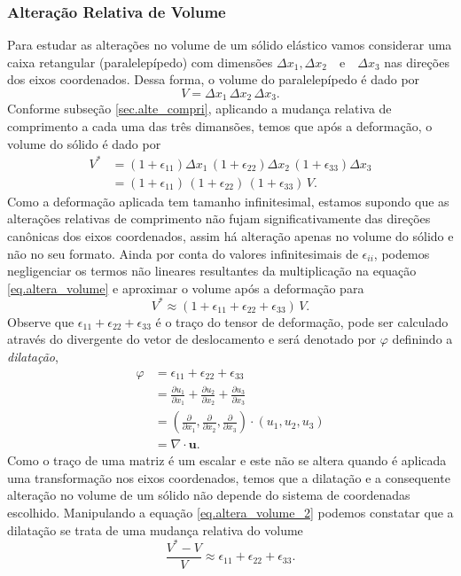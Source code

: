 \subsubsection{Altera\c{c}\~ao Relativa de Volume}

Para estudar as altera\c{c}\~oes no volume de um s\'olido el\'astico vamos considerar uma caixa retangular (paralelep\'ipedo) com dimens\~oes $\Delta x_1, \Delta x_2\quad\text{e}\quad\Delta x_3$ nas dire\c{c}\~oes dos eixos coordenados.  Dessa forma, o volume do paralelep\'ipedo \'e dado por\begin{equation*}
V=\Delta x_1\,\Delta x_2\,\Delta x_3.
\end{equation*}
Conforme subse\c{c}\~ao \ref{sec.alte_compri}, aplicando a mudan\c{c}a relativa de comprimento a cada uma das tr\^es dimans\~oes, temos que ap\'os a deforma\c{c}\~ao, o volume do s\'olido \'e dado por
\begin{align}\nonumber
V^*&=(1+\epsilon_{11})\Delta x_1\,(1+\epsilon_{22})\Delta x_2\,(1+\epsilon_{33})\Delta x_3\\\label{eq.altera_volume}
&=(1+\epsilon_{11})\,(1+\epsilon_{22})\,(1+\epsilon_{33})\,V.
\end{align}
Como a deforma\c{c}\~ao aplicada tem tamanho infinitesimal, estamos supondo que as altera\c{c}\~oes relativas de comprimento n\~ao fujam significativamente das dire\c{c}\~oes can\^onicas dos eixos coordenados, assim h\'a altera\c{c}\~ao apenas no volume do s\'olido e n\~ao no seu formato. Ainda por conta do valores infinitesimais de $\epsilon_{ii}$, podemos negligenciar os termos n\~ao lineares resultantes da multiplica\c{c}\~ao na equa\c{c}\~ao \ref{eq.altera_volume} e aproximar o volume ap\'os a deforma\c{c}\~ao para
\begin{equation}\label{eq.altera_volume_2}
V^*\approx(1+\epsilon_{11}+\epsilon_{22}+\epsilon_{33})\,V.
\end{equation}
Observe que $\epsilon_{11}+\epsilon_{22}+\epsilon_{33}$ \'e o tra\c{c}o do tensor de deforma\c{c}\~ao, pode ser calculado atrav\'es do divergente do vetor de deslocamento e ser\'a denotado por $\varphi$ definindo a \textit{dilata\c{c}\~ao},
\begin{align*}
\varphi &=\epsilon_{11}+\epsilon_{22}+\epsilon_{33}\\
&=\frac{\partial u_1}{\partial x_1}+\frac{\partial u_2}{\partial x_2}+\frac{\partial u_3}{\partial x_3}\\
&=\left(\frac{\partial}{\partial x_1},\frac{\partial}{\partial x_2},\frac{\partial}{\partial x_3}\right)\cdot(u_1,u_2,u_3)\\
&=\nabla\cdot \mathbf{u}.
\end{align*}
Como o tra\c{c}o de uma matriz \'e um escalar e este n\~ao se altera quando \'e aplicada uma transforma\c{c}\~ao nos eixos coordenados, temos que a dilata\c{c}\~ao e a consequente altera\c{c}\~ao no volume de um s\'olido n\~ao depende do sistema de coordenadas escolhido. Manipulando a equa\c{c}\~ao \ref{eq.altera_volume_2} podemos constatar que a dilata\c{c}\~ao se trata de uma mudan\c{c}a relativa do volume
\begin{equation*}
\frac{V^*-V}{V}\approx\epsilon_{11}+\epsilon_{22}+\epsilon_{33}.
\end{equation*}

